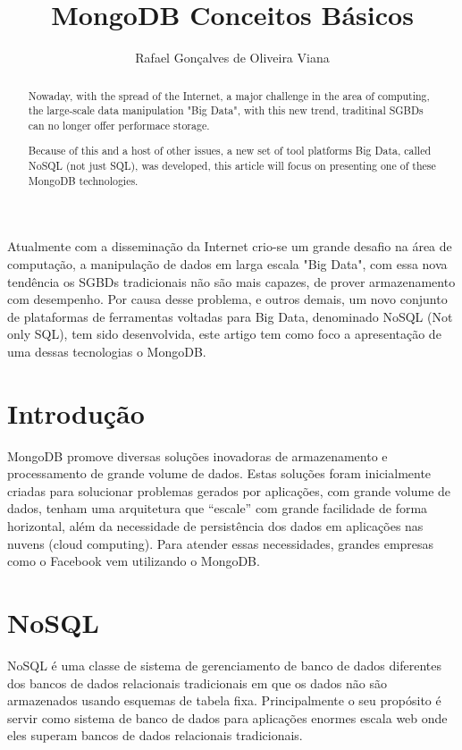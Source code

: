 \documentclass[12pt]{article}
\title{MongoDB Conceitos Básicos}
\author{Rafael Gonçalves de Oliveira Viana\inst{1} }
\begin{document}
 

\maketitle

\begin{abstract}
	Nowaday, with the spread of the Internet, a major challenge in the area of computing, the large-scale data manipulation "Big Data", with this new trend, traditinal SGBDs can no longer offer performace storage.
	
	Because of this and a host of other issues, a new set of tool platforms
	Big Data, called NoSQL (not just SQL), was developed, this article will focus on presenting one of these MongoDB technologies.
\end{abstract}
     
\begin{resumo} 
  Atualmente com a disseminação da Internet crio-se um grande desafio na área de computação, a manipulação de dados em larga escala "Big Data", com essa nova tendência os SGBDs tradicionais não são mais capazes, de prover armazenamento com desempenho. Por causa desse problema, e outros demais, um novo conjunto de plataformas de ferramentas voltadas para
  Big Data, denominado NoSQL (Not only SQL), tem sido desenvolvida, este artigo tem como foco a apresentação de uma dessas tecnologias o MongoDB.
  
  
\end{resumo}


\section{Introdução}
MongoDB promove diversas soluções inovadoras de armazenamento e processamento de grande volume de dados. Estas soluções foram inicialmente criadas para solucionar problemas gerados por aplicações, com grande volume de dados, tenham uma arquitetura que “escale” com grande facilidade de forma horizontal, além da necessidade de persistência dos dados em aplicações nas nuvens (cloud computing). Para atender essas necessidades, grandes empresas como o Facebook vem utilizando o MongoDB.


\section{NoSQL}

NoSQL é uma classe de sistema de gerenciamento de banco de dados
diferentes dos bancos de dados relacionais tradicionais em que os dados não são
armazenados usando esquemas de tabela fixa. Principalmente o seu propósito é
servir como sistema de banco de dados para aplicações enormes escala web onde
eles superam bancos de dados relacionais tradicionais.
\end{document}
